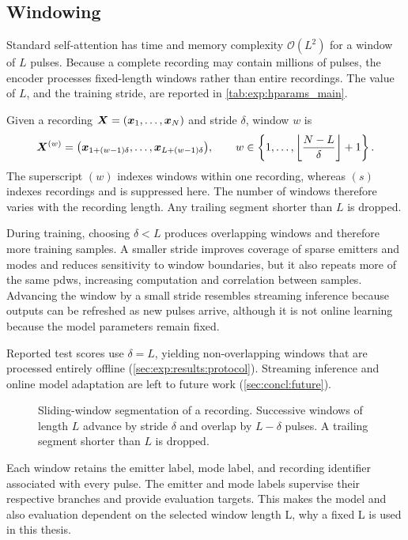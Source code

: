 \subsection{Windowing}\label{sec:method:data:window}

Standard self-attention has time and memory complexity $\mathcal{O}(L^2)$ for a window of $L$ pulses.
Because a complete recording may contain millions of pulses, the encoder processes fixed-length windows rather than entire recordings.
The value of $L$, and the training stride, are reported in \cref{tab:exp:hparams_main}.

Given a recording $\bm{X}=(\bm{x}_1,\ldots,\bm{x}_N)$ and stride $\delta$, window $w$ is
\begin{equation}\label{eq:method:windowing}
  \bm{X}^{(w)}
  =
  \bigl(\bm{x}_{1+(w-1)\delta},\ldots,\bm{x}_{L+(w-1)\delta}\bigr),
  \qquad
  w \in
  \left\{1,\ldots,\left\lfloor\frac{N-L}{\delta}\right\rfloor+1\right\}.
\end{equation}
The superscript $(w)$ indexes windows within one recording, whereas $(s)$ indexes recordings and is suppressed here.
The number of windows therefore varies with the recording length.
Any trailing segment shorter than $L$ is dropped.

During training, choosing $\delta<L$ produces overlapping windows and therefore more training samples.
A smaller stride improves coverage of sparse emitters and modes and reduces sensitivity to window boundaries, but it also repeats more of the same \glspl{pdw}, increasing computation and correlation between samples.
Advancing the window by a small stride resembles streaming inference because outputs can be refreshed as new pulses arrive, although it is not online learning because the model parameters remain fixed.

Reported test scores use $\delta=L$, yielding non-overlapping windows that are processed entirely offline (\cref{sec:exp:results:protocol}).
Streaming inference and online model adaptation are left to future work (\cref{sec:concl:future}).

\begin{figure}[tbp]
  \centering
  
  \caption{Sliding-window segmentation of a recording. Successive windows of length $L$ advance by stride $\delta$ and overlap by $L-\delta$ pulses. A trailing segment shorter than $L$ is dropped.}
  \label{fig:method:windowing}
\end{figure}

Each window retains the emitter label, mode label, and recording identifier associated with every pulse.
The emitter and mode labels supervise their respective branches and provide evaluation targets. This makes the model and also evaluation dependent on the selected window length L, why a fixed L is used in this thesis.

